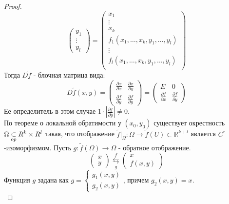 \begin{theorem}
\begin{proof}
\[\begin{pmatrix}
            y_1 \\ \vdots \\ y_l
        \end{pmatrix} = 
        \begin{pmatrix}
            x_1 \\ \vdots \\ x_k \\
            f_1(x_1, \hdots, x_k, y_1, \hdots, y_l) \\
            \vdots \\
            f_l(x_1, \hdots, x_k, y_1, \hdots, y_l) \\
        \end{pmatrix}\]
        Тогда $D\tilde{f}$ - блочная матрица вида:
        \[D\tilde{f}(x,y) = 
        \left(\begin{array}{c|c}
            \frac{\partial x}{\partial x} & \frac{\partial x}{\partial y} \\
            \hline
            \frac{\partial f}{\partial y} & \frac{\partial f}{\partial y}
        \end{array}\right) = 
        \left(\begin{array}{c|c}
            E & 0 \\
            \hline
            \frac{\partial f}{\partial x} & \frac{\partial f}{\partial y}
        \end{array}\right)\]
        Ее определитель в этом случае $1 \cdot \left| \frac{\partial f}{\partial y}\right| \neq 0$.\\
        По теореме о локальной обратимости у $(x_0, y_0)$ существует окрестность $\Omega \underset{op}{\subset} R^k \times R^l$ такая, 
        что отображение $\tilde{f} |_\Omega: \Omega \to \tilde{f}(U) \subset \mathbb{R}^{k+l}$ является $C^r$-изоморфизмом.
        Пусть $g: \tilde{f}(\Omega) \to \Omega$ - обратное отображение.
        \[\left(\begin{array}{c}
            x \\ y
        \end{array}\right)
        \overset{f}{\underset{g}{\leftrightarrows}}
        \left(\begin{array}{c}
            x \\
            f(x, y)
        \end{array}
        \right)\]
        Функция $g$ задана как $g = \begin{cases}
            g_1(x, y) \\
            g_2(x, y)
        \end{cases}$, причем $g_2(x,y) = x$. \\

\end{proof}
\end{theorem}
